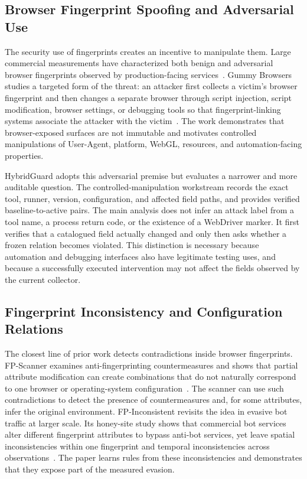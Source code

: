 \subsection{Browser Fingerprint Spoofing and Adversarial Use}

The security use of fingerprints creates an incentive to manipulate them. Large commercial measurements have characterized both benign and adversarial browser fingerprints observed by production-facing services~\cite{wu2023manyfaces}. Gummy Browsers studies a targeted form of the threat: an attacker first collects a victim's browser fingerprint and then changes a separate browser through script injection, script modification, browser settings, or debugging tools so that fingerprint-linking systems associate the attacker with the victim~\cite{liu2022gummy}. The work demonstrates that browser-exposed surfaces are not immutable and motivates controlled manipulations of User-Agent, platform, WebGL, resources, and automation-facing properties.

HybridGuard adopts this adversarial premise but evaluates a narrower and more auditable question. The controlled-manipulation workstream records the exact tool, runner, version, configuration, and affected field paths, and provides verified baseline-to-active pairs. The main analysis does not infer an attack label from a tool name, a process return code, or the existence of a WebDriver marker. It first verifies that a catalogued field actually changed and only then asks whether a frozen relation becomes violated. This distinction is necessary because automation and debugging interfaces also have legitimate testing uses, and because a successfully executed intervention may not affect the fields observed by the current collector.

\subsection{Fingerprint Inconsistency and Configuration Relations}

The closest line of prior work detects contradictions inside browser fingerprints. FP-Scanner examines anti-fingerprinting countermeasures and shows that partial attribute modification can create combinations that do not naturally correspond to one browser or operating-system configuration~\cite{vastel2018fpscanner}. The scanner can use such contradictions to detect the presence of countermeasures and, for some attributes, infer the original environment. FP-Inconsistent revisits the idea in evasive bot traffic at larger scale. Its honey-site study shows that commercial bot services alter different fingerprint attributes to bypass anti-bot services, yet leave spatial inconsistencies within one fingerprint and temporal inconsistencies across observations~\cite{venugopalan2025fpinconsistent}. The paper learns rules from these inconsistencies and demonstrates that they expose part of the measured evasion.

